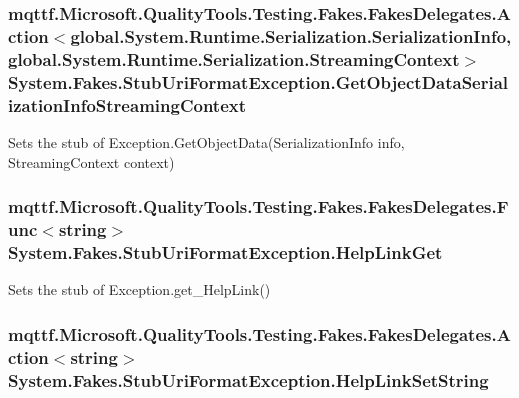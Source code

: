 \hypertarget{class_system_1_1_fakes_1_1_stub_uri_format_exception_a439d583e2dff14bee5328ed934971431}{
\subsubsection[{Get\-Object\-Data\-Serialization\-Info\-Streaming\-Context}]{\setlength{\rightskip}{0pt plus 5cm}mqttf.\-Microsoft.\-Quality\-Tools.\-Testing.\-Fakes.\-Fakes\-Delegates.\-Action$<$global.\-System.\-Runtime.\-Serialization.\-Serialization\-Info, global.\-System.\-Runtime.\-Serialization.\-Streaming\-Context$>$ System.\-Fakes.\-Stub\-Uri\-Format\-Exception.\-Get\-Object\-Data\-Serialization\-Info\-Streaming\-Context}}\label{class_system_1_1_fakes_1_1_stub_uri_format_exception_a439d583e2dff14bee5328ed934971431}


Sets the stub of Exception.\-Get\-Object\-Data(\-Serialization\-Info info, Streaming\-Context context)

\hypertarget{class_system_1_1_fakes_1_1_stub_uri_format_exception_a156be3dfb6cfb6d6a3fc72191d773f41}{
\subsubsection[{Help\-Link\-Get}]{\setlength{\rightskip}{0pt plus 5cm}mqttf.\-Microsoft.\-Quality\-Tools.\-Testing.\-Fakes.\-Fakes\-Delegates.\-Func$<$string$>$ System.\-Fakes.\-Stub\-Uri\-Format\-Exception.\-Help\-Link\-Get}}\label{class_system_1_1_fakes_1_1_stub_uri_format_exception_a156be3dfb6cfb6d6a3fc72191d773f41}


Sets the stub of Exception.\-get\-\_\-\-Help\-Link()

\hypertarget{class_system_1_1_fakes_1_1_stub_uri_format_exception_a12f531fc28c862c263f4398d84524771}{
\subsubsection[{Help\-Link\-Set\-String}]{\setlength{\rightskip}{0pt plus 5cm}mqttf.\-Microsoft.\-Quality\-Tools.\-Testing.\-Fakes.\-Fakes\-Delegates.\-Action$<$string$>$ System.\-Fakes.\-Stub\-Uri\-Format\-Exception.\-Help\-Link\-Set\-String}}\label{class_system_1_1_fakes_1_1_stub_uri_format_exception_a12f531fc28c862c263f4398d84524771}


